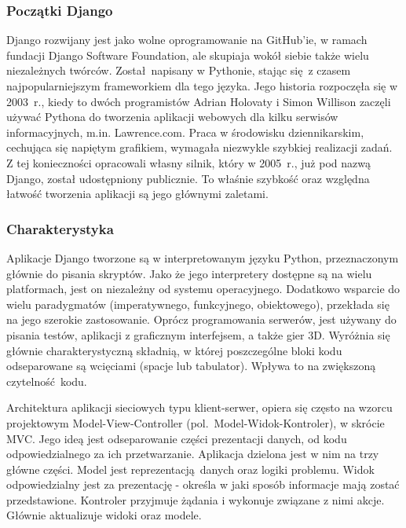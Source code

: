 \subsubsection*{Początki Django}
Django rozwijany jest jako wolne oprogramowanie na GitHub'ie, w ramach fundacji Django Software Foundation, ale skupiaja wokół siebie także wielu niezależnych twórców. Został napisany w Pythonie, stając się z czasem najpopularniejszym frameworkiem dla tego języka. Jego historia rozpoczęła się w 2003~r., kiedy to dwóch programistów Adrian Holovaty i Simon Willison zaczęli używać Pythona do tworzenia aplikacji webowych dla kilku serwisów informacyjnych, m.in. Lawrence.com. Praca w środowisku dziennikarskim, cechująca się napiętym grafikiem, wymagała niezwykle szybkiej realizacji zadań. Z tej konieczności opracowali własny silnik, który w 2005~r., już pod nazwą Django, został udostępniony publicznie. To właśnie szybkość oraz względna łatwość tworzenia aplikacji są jego głównymi zaletami.

\subsubsection*{Charakterystyka}
Aplikacje Django tworzone są w interpretowanym języku Python, przeznaczonym głównie do pisania skryptów. Jako że jego interpretery dostępne są na wielu platformach, jest on niezależny od systemu operacyjnego. Dodatkowo wsparcie do wielu paradygmatów (imperatywnego, funkcyjnego, obiektowego), przekłada się na jego szerokie zastosowanie. Oprócz programowania serwerów, jest używany do pisania testów, aplikacji z graficznym interfejsem, a także gier 3D. Wyróżnia się głównie charakterystyczną składnią, w której poszczególne bloki kodu odseparowane są wcięciami (spacje lub tabulator). Wpływa to na zwiększoną czytelność kodu.

Architektura aplikacji sieciowych typu klient-serwer, opiera się często na wzorcu projektowym Model-View-Controller (pol.~Model-Widok-Kontroler), w skrócie MVC. Jego ideą jest odseparowanie części prezentacji danych, od kodu odpowiedzialnego za ich przetwarzanie. Aplikacja dzielona jest w nim na trzy główne części. Model jest reprezentacją danych oraz logiki problemu. Widok odpowiedzialny jest za prezentację - określa w jaki sposób informacje mają zostać przedstawione. Kontroler przyjmuje żądania i wykonuje związane z nimi akcje. Głównie aktualizuje widoki oraz modele.


